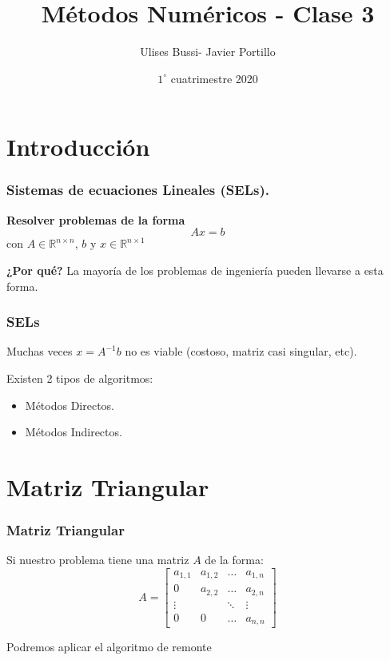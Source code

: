 \documentclass[xcolor=svgnames]{beamer} %
\title{Métodos Numéricos - Clase 3}
\author{Ulises Bussi- Javier Portillo}
\date{ $1^\circ$ cuatrimestre 2020}
\theoremstyle{plain}
\renewcommand{\textbf}[1]{{\bfseries\textcolor{redUnq2}{#1}}}
\theoremstyle{definition}
\begin{document}
 


\begin{frame} %
	\titlepage
\end{frame}


\section{Introducción}
\begin{frame}
\frametitle{Sistemas de ecuaciones Lineales (SELs).}

\vspace{10pt}


\begin{tcolorbox}
\textbf{Resolver problemas de la forma}
$$A x = b $$
con $ A \in \mathbb{R}^{n\times n}$, $b$ y $x\in \mathbb{R}^{n\times 1}$
\end{tcolorbox} \vspace{20pt}

\textbf{¿Por qué?}
\pause
La mayoría de los problemas de ingeniería pueden llevarse a esta forma.


\end{frame}



\begin{frame}
\frametitle{SELs}
Muchas veces $x = A^{-1} b$ no es viable (costoso, matriz casi singular, etc).

Existen 2 tipos de algoritmos:
\pause
\begin{itemize}
\item Métodos Directos.
\item Métodos Indirectos.
\end{itemize}

\end{frame}


\section{Matriz Triangular}

\begin{frame}
\frametitle{Matriz Triangular}

Si nuestro problema tiene una matriz $A$ de la forma:
$$A = \begin{bmatrix}
a_{1,1} & a_{1,2} 	& \dots 	 	& a_{1,n} \\
0       & a_{2,2} 	& \dots	 	& a_{2,n} \\
\vdots 	& 		  	& \ddots	 	& \vdots \\
0 		& 0			& \dots 		& a_{n,n}
\end{bmatrix}$$

Podremos aplicar el algoritmo de remonte
\end{frame}
\end{document}
